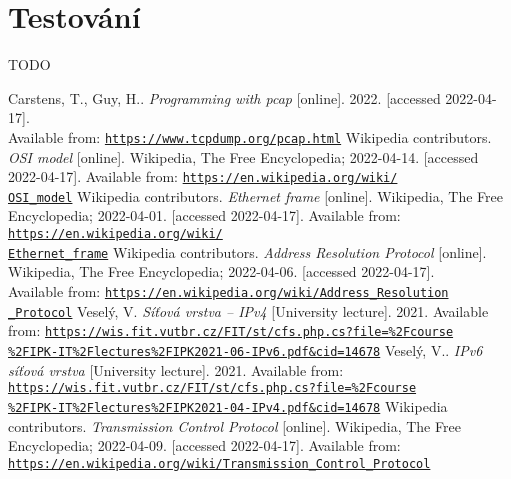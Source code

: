 \documentclass[12pt]{article}
\begin{document}
\section{Testování}
TODO
\pagebreak
\begin{thebibliography}{plain}
   Carstens, T., Guy, H..
	  \emph{Programming with pcap} [online]. 2022. [accessed 2022-04-17].\\
		Available from: \href{https://www.tcpdump.org/pcap.html}{\texttt{https://www.tcpdump.org/pcap.html}}
	 Wikipedia contributors.
	  \emph{OSI model} [online]. Wikipedia, The Free Encyclopedia; 2022-04-14. [accessed 2022-04-17]. 
		Available from: \href{https://en.wikipedia.org/wiki/OSI\_model}{\texttt{https://en.wikipedia.org/wiki/\\OSI\_model}}
	 Wikipedia contributors.
	  \emph{Ethernet frame} [online]. Wikipedia, The Free Encyclopedia; 2022-04-01. [accessed 2022-04-17]. 
		Available from: \href{https://en.wikipedia.org/wiki/Ethernet\_frame}{\texttt{https://en.wikipedia.org/wiki/\\Ethernet\_frame}}
	 Wikipedia contributors.
	  \emph{Address Resolution Protocol} [online]. Wikipedia, The Free Encyclopedia; 2022-04-06. [accessed 2022-04-17]. \\
		Available from: \href{https://en.wikipedia.org/wiki/Address\_Resolution\_Protocol}{\texttt{https://en.wikipedia.org/wiki/Address\_Resolution\\\_Protocol}}
	 Veselý, V. 
		\emph{Síťová vrstva -- IPv4} [University lecture]. 2021. 
		Available from: \href{https://wis.fit.vutbr.cz/FIT/st/cfs.php.cs?file=\%2Fcourse\%2FIPK-IT\%2Flectures\%2FIPK2021-06-IPv6.pdf&cid=14678}{\texttt{https://wis.fit.vutbr.cz/FIT/st/cfs.php.cs?file=\%2Fcourse\\\%2FIPK-IT\%2Flectures\%2FIPK2021-06-IPv6.pdf\&cid=14678}}
	 Veselý, V.. 
		\emph{IPv6 síťová vrstva} [University lecture]. 2021. 
		Available from: \href{https://wis.fit.vutbr.cz/FIT/st/cfs.php.cs?file=\%2Fcourse\%2FIPK-IT\%2Flectures\%2FIPK2021-04-IPv4.pdf&cid=14678}{\texttt{https://wis.fit.vutbr.cz/FIT/st/cfs.php.cs?file=\%2Fcourse\\\%2FIPK-IT\%2Flectures\%2FIPK2021-04-IPv4.pdf\&cid=14678}}
	 Wikipedia contributors.
	  \emph{Transmission Control Protocol} [online]. Wikipedia, The Free Encyclopedia; 2022-04-09. [accessed 2022-04-17]. 
		Available from: \href{https://en.wikipedia.org/wiki/Transmission\_Control\_Protocol}{\texttt{https://en.wikipedia.org/wiki/Transmission\_Control\_Protocol}}

\end{thebibliography}
\end{document}
